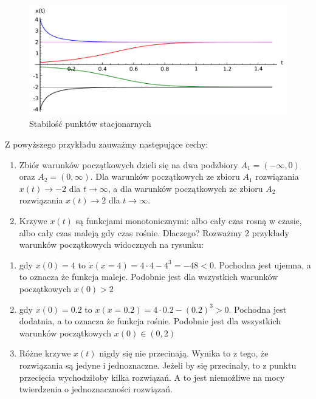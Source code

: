 \documentclass[a4paper,12pt,polish]{sphinxmanual}
\begin{document}
\begin{figure}[htbp]
\centering
\capstart

\includegraphics{sage_chI023_02.pdf}
\caption{Stabilość punktów stacjonarnych}\end{figure}

Z powyższego przykładu zauważmy następujące cechy:
\begin{enumerate}
\item {} 
Zbiór warunków początkowych dzieli się na dwa podzbiory $A_1 = (-\infty, 0)$ oraz  $A_2=(0, \infty)$. Dla warunków  początkowych ze zbioru $A_1$ rozwiązania $x(t) \to -2$ dla $t\to\infty$, a  dla warunków  początkowych ze zbioru $A_2$ rozwiązania $x(t) \to 2$ dla $t\to\infty$.

\item {} 
Krzywe $x(t)$  są funkcjami monotonicznymi: albo cały czas rosną w czasie, albo cały czas maleją gdy czas rośnie. Dlaczego? Rozważmy  2 przykłady warunków początkowych widocznych na rysunku:

\end{enumerate}
\begin{enumerate}
\item {} 
gdy $x(0) = 4$ to $\dot x (x=4) = 4\cdot 4 -4^3 = -48 < 0$.   Pochodna jest ujemna, a to oznacza że funkcja maleje. Podobnie jest dla wszystkich warunków początkowych $x(0) > 2$

\item {} 
gdy $x(0) = 0.2$ to $\dot x (x=0.2) = 4\cdot 0.2 -(0.2)^3 > 0$.  Pochodna jest dodatnia, a to oznacza że funkcja rośnie. Podobnie jest dla wszystkich warunków początkowych $x(0)  \in (0, 2)$

\end{enumerate}
\begin{enumerate}
\setcounter{enumi}{2}
\item {} 
Różne krzywe $x(t)$ nigdy się nie przecinają. Wynika to z tego, że rozwiązania są jedyne i jednoznaczne. Jeżeli by się przecinały,  to z punktu przecięcia wychodziłoby kilka rozwiązań. A to jest niemożliwe na mocy twierdzenia o jednoznaczności rozwiązań.

\end{enumerate}
\end{document}
